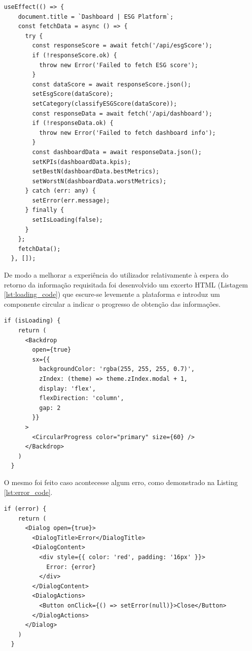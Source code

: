 \begin{lstlisting}[style=customts, caption={Função responsável por obter os dados do ESG Score e do dashboard no carregamento do componente}, label={lst:fetch_dashboard}]
 useEffect(() => {
    document.title = `Dashboard | ESG Platform`;
    const fetchData = async () => {
      try {
        const responseScore = await fetch('/api/esgScore');
        if (!responseScore.ok) {
          throw new Error('Failed to fetch ESG score');
        }
        const dataScore = await responseScore.json();
        setEsgScore(dataScore);
        setCategory(classifyESGScore(dataScore));
        const responseData = await fetch('/api/dashboard');
        if (!responseData.ok) {
          throw new Error('Failed to fetch dashboard info');
        }
        const dashboardData = await responseData.json();
        setKPIs(dashboardData.kpis);
        setBestN(dashboardData.bestMetrics);
        setWorstN(dashboardData.worstMetrics);
      } catch (err: any) {
        setError(err.message);
      } finally {
        setIsLoading(false);
      }
    };
    fetchData();
  }, []);
\end{lstlisting}

De modo a melhorar a experiência do utilizador relativamente à espera do retorno da informação requisitada foi desenvolvido um excerto HTML (Listagem \ref{lst:loading_code}) que escure-se levemente a plataforma e introduz um componente circular a indicar o progresso de obtenção das informações.

\begin{lstlisting}[style=customts, caption={Componente mostrado no carregamento da página}, label={lst:loading_code}]
  if (isLoading) {
    return (
      <Backdrop
        open={true}
        sx={{
          backgroundColor: 'rgba(255, 255, 255, 0.7)',
          zIndex: (theme) => theme.zIndex.modal + 1,
          display: 'flex',
          flexDirection: 'column',
          gap: 2
        }}
      >
        <CircularProgress color="primary" size={60} />
      </Backdrop>
    )
  }
\end{lstlisting}

O mesmo foi feito caso acontecesse algum erro, como demonstrado na Listing \ref{lst:error_code}.

\begin{lstlisting}[style=customts, caption={Componente mostrado no caso de erro no carregamento da página}, label={lst:error_code}]
  if (error) {
    return (
      <Dialog open={true}>
        <DialogTitle>Error</DialogTitle>
        <DialogContent>
          <div style={{ color: 'red', padding: '16px' }}>
            Error: {error}
          </div>
        </DialogContent>
        <DialogActions>
          <Button onClick={() => setError(null)}>Close</Button>
        </DialogActions>
      </Dialog>
    )
  }
\end{lstlisting}

